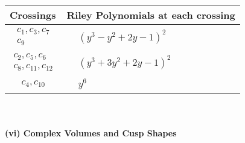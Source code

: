 \documentclass[1p]{elsarticle_modified}
\theoremstyle{definition}
\begin{document}
\begin{tabular}{m{50pt}|m{274pt}}
Crossings & \hspace{64pt}Riley Polynomials at each crossing \\
\hline $$\begin{aligned}c_{1},c_{3},c_{7}\\c_{9}\end{aligned}$$&$\begin{aligned}
&(y^3- y^2+2 y-1)^2
\end{aligned}$\\
\hline $$\begin{aligned}c_{2},c_{5},c_{6}\\c_{8},c_{11},c_{12}\end{aligned}$$&$\begin{aligned}
&(y^3+3 y^2+2 y-1)^2
\end{aligned}$\\
\hline $$\begin{aligned}c_{4},c_{10}\end{aligned}$$&$\begin{aligned}
&y^6
\end{aligned}$\\
\hline
\end{tabular}\\~\\
\newpage\flushleft \textbf{(vi) Complex Volumes and Cusp Shapes}
\end{document}
